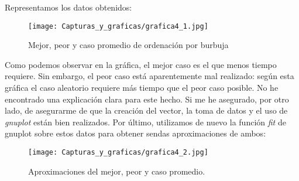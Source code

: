 \documentclass[11pt,a4paper]{article}
\begin{document}
Representamos los datos obtenidos:

\begin{figure}[H]
	\centering
	\texttt{[image: Capturas\_y\_graficas/grafica4\_1.jpg]}
	\caption{Mejor, peor y caso promedio de ordenación por burbuja}
\end{figure}

Como podemos observar en la gráfica, el mejor caso es el que menos tiempo requiere. Sin embargo, el peor caso está aparentemente mal realizado: según esta gráfica el caso aleatorio requiere más tiempo que el peor caso posible. No he encontrado una explicación clara para este hecho. Si me he asegurado, por otro lado, de asegurarme de que la creación del vector, la toma de datos y el uso de \emph{gnuplot} están bien realizados. Por último, utilizamos de nuevo la función \emph{fit} de gnuplot sobre estos datos para obtener sendas aproximaciones de ambos:

\begin{figure}[H]
	\centering
	\texttt{[image: Capturas\_y\_graficas/grafica4\_2.jpg]}
	\caption{Aproximaciones del mejor, peor y caso promedio.}
\end{figure}
\end{document}
